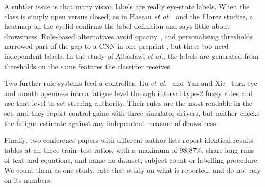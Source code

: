 A subtler issue is that many vision labels are really eye-state labels. When the class is simply open versus closed, as in Hassan \textit{et al.}~\cite{hassan2025realtime} and the Florez studies, a heatmap on the eyelid confirms the label definition and says little about drowsiness. Rule-based alternatives avoid opacity \cite{albadawi2023realtime,ersoy2026improving}, and personalising thresholds narrowed part of the gap to a CNN in one preprint \cite{ersoy2026improving}, but these too need independent labels. In the study of Albadawi \textit{et al.}, the labels are generated from thresholds on the same features the classifier receives.

Two further rule systems feed a controller. Hu \textit{et al.}~\cite{hu2026human} and Yan and Xie~\cite{yan2026toward} turn eye and mouth openness into a fatigue level through interval type-2 fuzzy rules and use that level to set steering authority. Their rules are the most readable in the set, and they report control gains with three simulator drivers, but neither checks the fatigue estimate against any independent measure of drowsiness.

Finally, two conference papers with different author lists \cite{sasikala2026robust,nayomi2026vision} report identical results tables at all three train--test ratios, with a maximum of 98.87\%, share long runs of text and equations, and name no dataset, subject count or labelling procedure. We count them as one study, rate that study on what is reported, and do not rely on its numbers.


